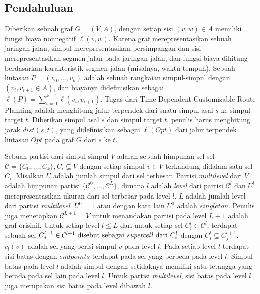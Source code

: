 \subsection{Pendahuluan}
\label{subsec:tdcrp-preliminaries}
Diberikan sebuah graf $G=(V,A)$, dengan setiap sisi $(v,w)\in A$ memiliki fungsi biaya nonnegatif $\ell(v,w)$. Karena graf merepresentasikan sebuah jaringan jalan, simpul merepresentasikan persimpangan dan sisi merepresentasikan segmen jalan pada jaringan jalan, dan fungsi biaya dihitung berdasarkan karakteristik segmen jalan (misalnya, waktu tempuh). Sebuah lintasan $P=(v_0,\ldots,v_k)$ adalah sebuah rangkaian simpul-simpul dengan $(v_i, v_{i+1}\in A)$, dan biayanya didefinisikan sebagai $\ell(P)=\sum_{i=0}^{k-1}\ell(v_i,v_{i+1})$. Tugas dari Time-Dependent Customizable Route Planning adalah menghitung  jalur terpendek dari suatu simpul asal $s$ ke simpul target $t$. Diberikan simpul asal $s$ dan simpul target $t$, penulis harus menghitung jarak $dist(s,t)$, yang didefinisikan sebagai $\ell(Opt)$ dari jalur terpendek lintasan $Opt$ pada graf $G$ dari $s$ ke $t$.

Sebuah partisi dari simpul-simpul $V$ adalah sebuah himpunan sel-sel $\mathcal{C}=\{C_0,\ldots, C_k\}, C_i\subseteq V$ dengan setiap simpul $v\in V$ terkandung didalam satu sel $C_i$. Misalkan $U$ adalah jumlah simpul dari sel terbesar. Partisi \textit{multilevel} dari $V$ adalah himpunan partisi $\{\mathcal{C}^{0},\ldots, \mathcal{C}^{L}\}$, dimana $l$ adalah \textit{level} dari partisi $\mathcal{C}^{l}$ dan $U^{l}$ merepresentasikan ukuran dari sel terbesar pada level $l$. $L$ adalah jumlah level dari  partisi \textit{multilevel}. $U^{0}=1$ atau dengan kata lain $U^{0}$ adalah $singleton$. Penulis juga menetapkan $\mathcal{C}^{L+1}=V$ untuk menandakan partisi pada level $L+1$ adalah graf orisinil. Untuk setiap level $l\leq L$ dan untuk setiap sel $C_{i}^{l}\in\mathcal{C}^l$, terdapat sebuah sel $C_{j}^{l+1}\in\mathcal{C}^{l+1} \text{ disebut sebagai \textit{supercell} dari } C_i^l$ dengan $C_i^l\subseteq C_j^{l+1}$. $c_l(v)$ adalah sel yang berisi simpul $v$ pada level $l$. Pada setiap level $l$ terdapat sisi batas dengan $endpoints$ terdapat pada sel yang berbeda pada level-$l$. Simpul batas pada level $l$ adalah simpul dengan setidaknya memiliki satu tetangga yang berada pada sel lain pada level $l$.  Untuk partisi \textit{multilevel}, sisi batas pada level $l$ juga merupakan sisi batas pada level dibawah $l$.

